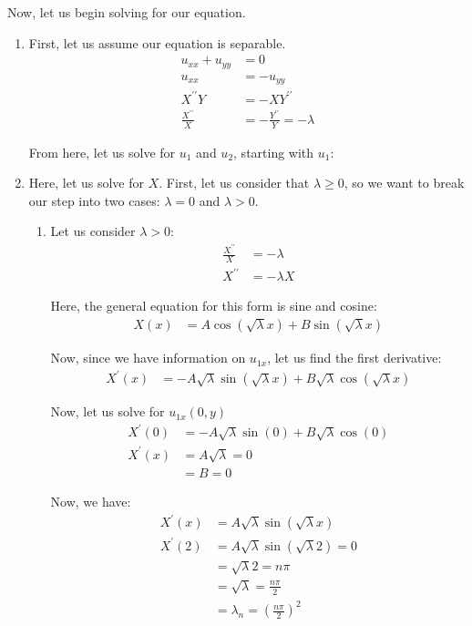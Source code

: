 Now, let us begin solving for our equation.
%
\begin{enumerate}
  \item First, let us assume our equation is separable.
  \begin{align}
    u_{xx} + u_{yy} & = 0\\
    u_{xx} & = -u_{yy}\\
    X^{\prime\prime}Y & = -XY^{\prime\prime}\\
    \frac{X^{\prime\prime}}{X} & = -\frac{Y^{\prime\prime}}{Y} = -\lambda
  \end{align}

  From here, let us solve for $u_1$ and $u_2$, starting with $u_1$:
  \item Here, let us solve for $X$. First, let us consider that $\lambda \geq 0$, so we want to break our step into two cases: $\lambda = 0$ and $\lambda > 0$.
  \begin{enumerate}
    \item Let us consider $\lambda > 0$:
  \begin{align}
    \frac{X^{\prime\prime}}{X} & = -\lambda\\
    X^{\prime\prime} & = -\lambda X
  \end{align}

  Here, the general equation for this form is sine and cosine:
  \begin{align}
    X(x) & = A \cos(\sqrt \lambda x) + B \sin(\sqrt \lambda x)
  \end{align}

  Now, since we have information on $u_{1x}$, let us find the first derivative:
  \begin{align}
    X^\prime(x) & = -A \sqrt \lambda \sin(\sqrt \lambda x) + B \sqrt \lambda \cos(\sqrt \lambda x)
  \end{align}

  Now, let us solve for $u_{1x}(0, y)$
  \begin{align}
    X^\prime(0) & = -A \sqrt \lambda \sin(0) + B \sqrt \lambda \cos(0)\\
    X^\prime(x) & = A \sqrt \lambda = 0\\
    & = B = 0
  \end{align}

  Now, we have:
  \begin{align}
    X^\prime(x) & = A \sqrt \lambda \sin(\sqrt \lambda x)\\
    X^\prime(2) & = A \sqrt \lambda \sin(\sqrt \lambda 2) = 0\\
    & = \sqrt \lambda 2 = n \pi\\
    & = \sqrt \lambda = \frac{n \pi}{2}\\
    & = \lambda_{n} = \left(\frac{n \pi}{2}\right)^2
  \end{align}


\end{enumerate}
\end{enumerate}
